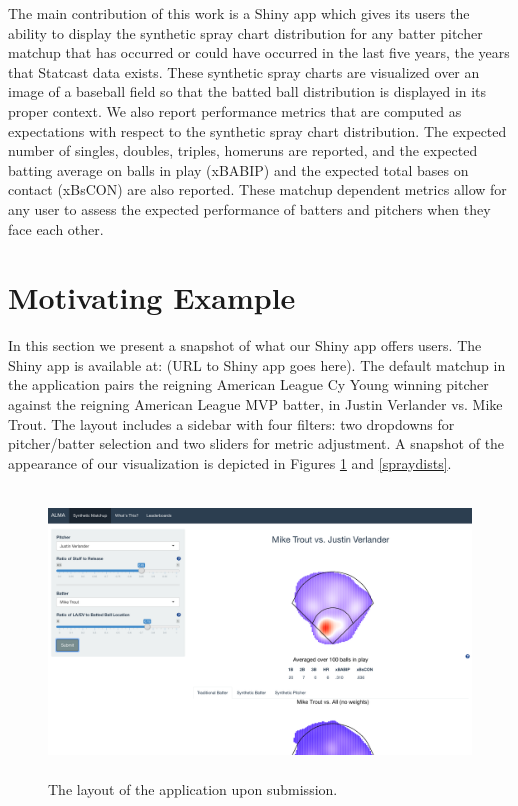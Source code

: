 \documentclass[11pt]{article}
\begin{document}
The main contribution of this work is a Shiny app which gives its users the ability to display the synthetic spray chart distribution for any batter pitcher matchup that has occurred or could have occurred in the last five years, the years that Statcast data exists. These synthetic spray charts are visualized over an image of a baseball field so that the batted ball distribution is displayed in its proper context. We also report performance metrics that are computed as expectations with respect to the synthetic spray chart distribution. The expected number of singles, doubles, triples, homeruns are reported, and the expected batting average on balls in play (xBABIP) and the expected total bases on contact (xBsCON) are also reported. These matchup dependent metrics allow for any user to assess the expected performance of batters and pitchers when they face each other. 



\section{Motivating Example}

In this section we present a snapshot of what our Shiny app offers users. The Shiny app is available at: (URL to Shiny app goes here). The default matchup in the application pairs the reigning American League Cy Young winning pitcher against the reigning American League MVP batter, in Justin Verlander vs. Mike Trout. The layout includes a sidebar with four filters: two dropdowns for pitcher/batter selection and two sliders for metric adjustment. A snapshot of the appearance of our visualization is depicted in Figures \ref{layout} and \ref{spraydists}.


\begin{figure}
\centering
    \includegraphics[width=5.5in, height=3in]{layout.png}
    \caption{The layout of the application upon submission.}
    \label{layout}
\end{figure}
\end{document}
